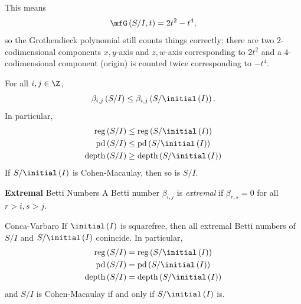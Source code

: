 \documentclass[co439]{subfiles}
\begin{document}
\begin{example}{}
        \noindent
        This means
        \begin{equation*}
            \mfG\left( S /I,t \right)=2t^{2}-t^{4},
        \end{equation*}
        so the Grothendieck polynomial still counts things correctly; there are two $2$-codimensional components $x,y$-axis and $z,w$-axis corresponding to $2t^{2}$ and a $4$-codimensional component (origin) is counted twice corresponding to $-t^{4}$.
    \end{example}

    \rruleline

    \begin{theorem}{}
        For all $i,j\in\Z$,
        \begin{equation*}
            \beta_{i,j}\left( S /I \right) \leq \beta_{i,j}\left( S /\initial\left( I \right) \right).
        \end{equation*}
        In particular,
        \begin{equation*}
            \begin{aligned}
                \reg\left( S /I \right) & \leq \reg\left( S /\initial\left( I \right)  \right) \\
                \pd\left( S /I \right) & \leq \pd\left( S /\initial\left( I \right)  \right) \\
                \depth\left( S /I \right) & \geq \depth\left( S /\initial\left( I \right)  \right) \\
            \end{aligned} 
        \end{equation*}
        If $S /\initial\left( I \right)$ is Cohen-Macaulay, then so is $S /I$.
    \end{theorem}

    \rruleline

    \begin{definition}{\textbf{Extremal} Betti Numbers}
        A Betti number $\beta_{i,j}$ is \emph{extremal} if $\beta_{r,s} = 0$ for all $r>i, s>j$.
    \end{definition}

    \begin{theorem}{Conca-Varbaro}
        If $\initial\left( I \right)$ is squarefree, then all extremal Betti numbers of $S /I$ and $S /\initial\left( I \right)$ conincide. In particular,
        \begin{equation*}
            \begin{aligned}
                \reg\left( S /I \right) & = \reg\left( S /\initial\left( I \right)  \right) \\
                \pd\left( S /I \right) & = \pd\left( S /\initial\left( I \right)  \right) \\
                \depth\left( S /I \right) & = \depth\left( S /\initial\left( I \right)  \right) \\
            \end{aligned} 
        \end{equation*}
        and $S /I$ is Cohen-Macaulay if and only if $S /\initial\left( I \right)$ is.
    \end{theorem}
\end{document}
